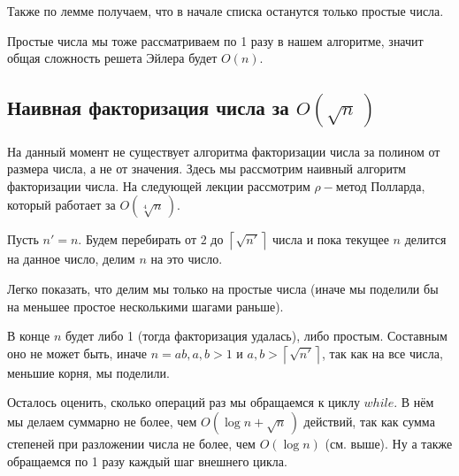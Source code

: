 \documentclass[a4paper, 12pt]{article}
\begin{document}
Также по лемме получаем, что в начале списка останутся только простые числа.

Простые числа мы тоже рассматриваем по 1 разу в нашем алгоритме, значит
общая сложность решета Эйлера будет $O(n)$.

\subsection{Наивная факторизация числа за $O(\sqrt{n}\,)$}

На данный момент не существует алгоритма факторизации числа за
полином от размера числа, а не от значения. Здесь мы рассмотрим наивный алгоритм
факторизации числа. На следующей лекции рассмотрим $\rho-$метод Полларда, который работает за $O(\sqrt[4]{n}\,)$.

Пусть $n' = n$.
Будем перебирать от $2$ до $\left\lceil \sqrt{n'} \right\rceil$ числа и пока
текущее $n$ делится на данное число, делим $n$ на это число.

Легко показать, что делим мы только на простые числа (иначе мы поделили бы на
меньшее простое несколькими шагами раньше).

В конце $n$ будет либо 1 (тогда факторизация удалась), либо простым. Составным
оно не может быть, иначе $n = ab, a, b > 1$ и $a, b > \left\lceil \sqrt{n'}\right\rceil$, 
так как на все числа, меньшие корня, мы поделили.

Осталось оценить, сколько операций раз мы обращаемся к циклу $while$. В нём мы делаем
суммарно не более, чем $O(\log n + \sqrt{n}\,)$ действий, так как сумма
степеней при разложении числа не более, чем $O(\log n)$ (см. выше). Ну а также
обращаемся по 1 разу каждый шаг внешнего цикла.
\end{document}
